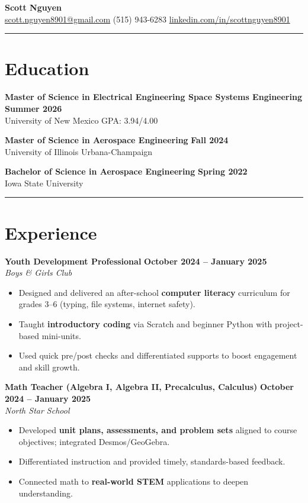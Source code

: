 \documentclass[10pt]{article}
\newcommand{\sectionline}{\noindent\rule{\linewidth}{0.4pt}}
\begin{document}
	
	\begin{center}
		{\color{mygreen}
			{\Huge \textbf{Scott Nguyen}} \\
			\small
			\href{mailto:scott.nguyen8901@gmail.com}{scott.nguyen8901@gmail.com} \textbar
			(515) 943-6283 \textbar
			\href{https://www.linkedin.com/in/scottnguyen8901/}{linkedin.com/in/scottnguyen8901}
		}
	\end{center}
	
	\sectionline
	
	\section*{Education}
	
	\textbf{Master of Science in Electrical Engineering \textbar{} Space Systems Engineering} \hfill \textbf{Summer 2026} \\
	University of New Mexico \hfill GPA: 3.94/4.00
	
	\textbf{Master of Science in Aerospace Engineering} \hfill \textbf{Fall 2024} \\
	University of Illinois Urbana-Champaign
	
	\textbf{Bachelor of Science in Aerospace Engineering} \hfill \textbf{Spring 2022} \\
	Iowa State University
	
	\sectionline
	
	\section*{Experience}
	
	\textbf{Youth Development Professional} \hfill \textbf{October 2024 -- January 2025} \\
	\emph{Boys \& Girls Club}
	\begin{itemize}
		\item Designed and delivered an after-school \textbf{computer literacy} curriculum for grades 3--6 (typing, file systems, internet safety).
		\item Taught \textbf{introductory coding} via Scratch and beginner Python with project-based mini-units.
		\item Used quick pre/post checks and differentiated supports to boost engagement and skill growth.
	\end{itemize}
	
	\textbf{Math Teacher (Algebra I, Algebra II, Precalculus, Calculus)} \hfill \textbf{October 2024 -- January 2025} \\
	\emph{North Star School}
	\begin{itemize}
		\item Developed \textbf{unit plans, assessments, and problem sets} aligned to course objectives; integrated Desmos/GeoGebra.
		\item Differentiated instruction and provided timely, standards-based feedback.
		\item Connected math to \textbf{real-world STEM} applications to deepen understanding.
	\end{itemize}
	
\end{document}
